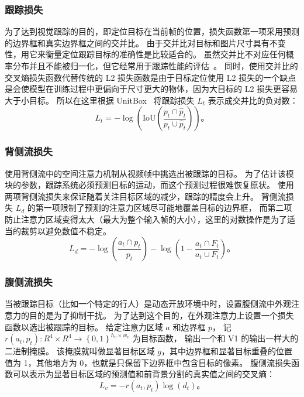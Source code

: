 \subsubsection{跟踪损失}
为了达到视觉跟踪的目的，即定位目标在当前帧的位置，损失函数第一项采用预测的边界框和真实边界框之间的交并比。
由于交并比对目标和图片尺寸具有不变性，用它来衡量定位跟踪目标的准确性是比较适合的。
虽然交并比不对应任何概率分布并且不能被归一化，但它经常用于跟踪性能的评估~\cite{vot2016}。
同时，使用交并比的交叉熵损失函数代替传统的 L2 损失函数是由于目标定位使用 L2 损失的一个缺点是会使模型在训练过程中更偏向于尺寸更大的物体，因为大目标的 L2 损失更容易大于小目标。
所以在这里根据 UnitBox~\cite{unitbox} 将跟踪损失 $ L_t $ 表示成交并比的负对数：
\begin{equation}
L_t = -\log(\mbox{IoU} ( \frac{p_t \cap \hat{p}_t}{p_t \cup \hat{p}_t} ))\mbox{。}
\end{equation}

\subsubsection{背侧流损失}
使用背侧流中的空间注意力机制从视频帧中挑选出被跟踪的目标。
为了估计该模块的参数，跟踪系统必须预测目标的运动，而这个预测过程很难恢复原状。
使用两项背侧流损失来保证随着关注目标区域的减少，跟踪的精度会上升。
背侧流损失 $ L_d $ 的第一项限制了预测的注意力区域尽可能地覆盖目标的边界框，
而第二项防止注意力区域变得太大（最大为整个输入帧的大小），这里的对数操作是为了适当的裁剪以避免数值不稳定。
\begin{equation}
L_d = -\log (\frac{a_t \cap p_t}{p_t}) - \log (1 - \frac{a_t \cap F_t}{a_t \cup F_t})\mbox{。}
\end{equation}

\subsubsection{腹侧流损失}
当被跟踪目标（比如一个特定的行人）是动态开放环境中时，设置腹侧流中外观注意力的目的是为了抑制干扰。
为了达到这个目的，在外观注意力上设置一个损失函数以选出被跟踪的目标。
给定注意力区域 $a$ 和边界框 $p$，%
记 $r(a_t, p_t): R^4 \times R^4 \rightarrow \left\{0,1\right\} ^{h_v \times w_v}$ 为目标函数，
输出一个和 V1 的输出一样大的二进制掩膜。
该掩膜就叫做显著目标区域 $g$，其中边界框和显著目标重叠的位置值为 1，其他地方为 0，也就是只保留下边界框中包含目标的像素。
腹侧流损失函数可以表示为显著目标区域的预测值和前背景分割的真实值之间的交叉熵：
\begin{equation}
L_v = - r(a_t, p_t) \log(d_t)\mbox{。}
\end{equation}

